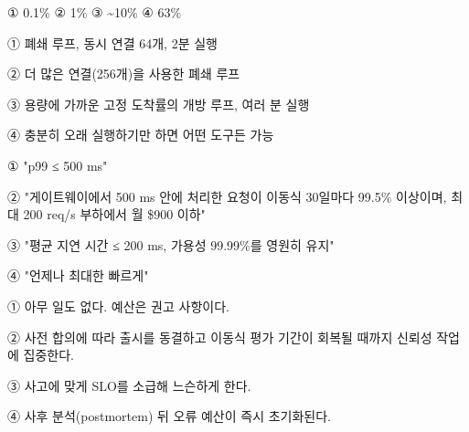 
\begin{tbboptions}
  \item ① 0.1\%        ② 1\%        ③ \textasciitilde{}10\%        ④ 63\%
\end{tbboptions}


\begin{tbboptions}
  \item ① 폐쇄 루프, 동시 연결 64개, 2분 실행
  \item ② 더 많은 연결(256개)을 사용한 폐쇄 루프
  \item ③ 용량에 가까운 고정 도착률의 개방 루프, 여러 분 실행
  \item ④ 충분히 오래 실행하기만 하면 어떤 도구든 가능
\end{tbboptions}


\begin{tbboptions}
  \item ① "p99 ≤ 500 ms" 
  \item ② "게이트웨이에서 500 ms 안에 처리한 요청이 이동식 30일마다 99.5\% 이상이며, 최대 200 req/s 부하에서 월 \$900 이하"
  \item ③ "평균 지연 시간 ≤ 200 ms, 가용성 99.99\%를 영원히 유지"
  \item ④ "언제나 최대한 빠르게"
\end{tbboptions}


\begin{tbboptions}
  \item ① 아무 일도 없다. 예산은 권고 사항이다.
  \item ② 사전 합의에 따라 출시를 동결하고 이동식 평가 기간이 회복될 때까지 신뢰성 작업에 집중한다.
  \item ③ 사고에 맞게 SLO를 소급해 느슨하게 한다.
  \item ④ 사후 분석(postmortem) 뒤 오류 예산이 즉시 초기화된다.
\end{tbboptions}


